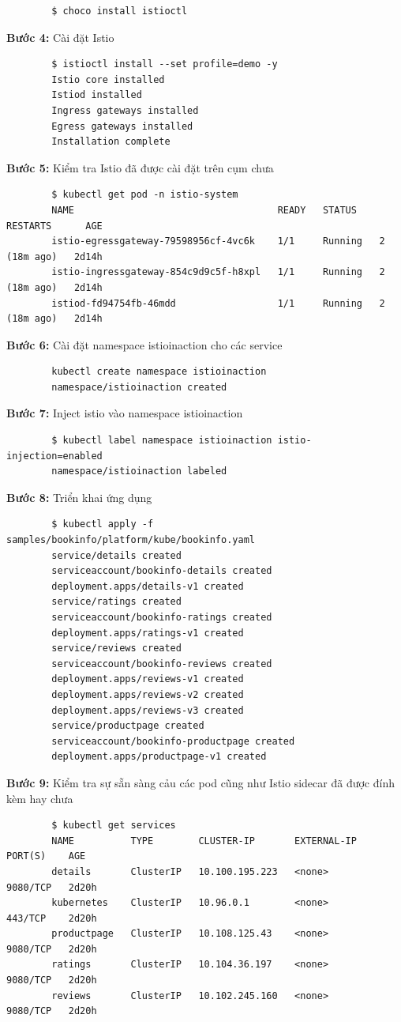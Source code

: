\documentclass[14pt,a4paper]{book}
\begin{document}
{{\begin{lstlisting}
		$ choco install istioctl
	\end{lstlisting}
	\textbf{Bước 4:} Cài đặt Istio
	\begin{lstlisting}
		$ istioctl install --set profile=demo -y
		Istio core installed
		Istiod installed
		Ingress gateways installed
		Egress gateways installed
		Installation complete                                                        
	\end{lstlisting}
	\textbf{Bước 5:} Kiểm tra Istio đã được cài đặt trên cụm chưa
	\begin{lstlisting}
		$ kubectl get pod -n istio-system
		NAME                                    READY   STATUS    RESTARTS      AGE
		istio-egressgateway-79598956cf-4vc6k    1/1     Running   2 (18m ago)   2d14h
		istio-ingressgateway-854c9d9c5f-h8xpl   1/1     Running   2 (18m ago)   2d14h
		istiod-fd94754fb-46mdd                  1/1     Running   2 (18m ago)   2d14h
	\end{lstlisting}
	\textbf{Bước 6:} Cài đặt namespace istioinaction cho các service 
	\begin{lstlisting}
		kubectl create namespace istioinaction
		namespace/istioinaction created
	\end{lstlisting}
	\textbf{Bước 7:} Inject istio vào namespace istioinaction
	\begin{lstlisting}
		$ kubectl label namespace istioinaction istio-injection=enabled
		namespace/istioinaction labeled
	\end{lstlisting}
	\textbf{Bước 8:} Triển khai ứng dụng 
	\begin{lstlisting}
		$ kubectl apply -f samples/bookinfo/platform/kube/bookinfo.yaml
		service/details created
		serviceaccount/bookinfo-details created
		deployment.apps/details-v1 created
		service/ratings created
		serviceaccount/bookinfo-ratings created
		deployment.apps/ratings-v1 created
		service/reviews created
		serviceaccount/bookinfo-reviews created
		deployment.apps/reviews-v1 created
		deployment.apps/reviews-v2 created
		deployment.apps/reviews-v3 created
		service/productpage created
		serviceaccount/bookinfo-productpage created
		deployment.apps/productpage-v1 created
	\end{lstlisting}
	\textbf{Bước 9:} Kiểm tra sự sẵn sàng cảu các pod cũng như Istio sidecar đã được đính kèm hay chưa
	\begin{lstlisting}
		$ kubectl get services
		NAME          TYPE        CLUSTER-IP       EXTERNAL-IP   PORT(S)    AGE
		details       ClusterIP   10.100.195.223   <none>        9080/TCP   2d20h
		kubernetes    ClusterIP   10.96.0.1        <none>        443/TCP    2d20h
		productpage   ClusterIP   10.108.125.43    <none>        9080/TCP   2d20h
		ratings       ClusterIP   10.104.36.197    <none>        9080/TCP   2d20h
		reviews       ClusterIP   10.102.245.160   <none>        9080/TCP   2d20h
		

\end{lstlisting}}}
\end{document}

